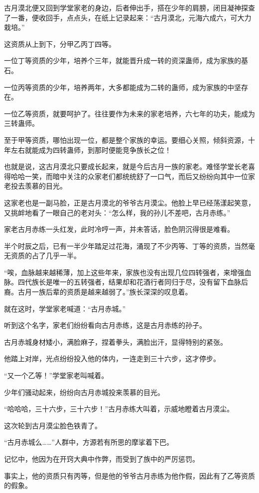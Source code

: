 \begin{this_body}
古月漠北便又回到学堂家老的身边，后者伸出手，搭在少年的肩膀，闭目凝神探查了一番，便收回手，点点头，在纸上记录起来：“古月漠北，元海六成六，可大力栽培。”

这资质从上到下，分甲乙丙丁四等。

一位丁等资质的少年，培养个三年，就能晋升成一转的资深蛊师，成为家族的基石。

一位丙等资质的少年，培养两年，大多都能成为二转的蛊师，成为家族的中坚存在。

一位乙等资质，就要呵护了。往往要作为未来的家老培养，六七年的功夫，能成为三转蛊师。

至于甲等资质，哪怕出现一位，都是整个家族的幸运。要细心关照，倾斜资源，十年左右就能成为四转蛊师，到那时便能竞争族长之位！

也就是说，这古月漠北只要成长起来，就是今后古月一族的家老。难怪学堂长老喜得哈哈一笑，而暗中关注的众家老们都统统舒了一口气，而后又纷纷向其中一位家老投去羡慕的目光。

这家老也是一副马脸，正是古月漠北的爷爷古月漠尘。他脸上早已经荡漾起笑意，又挑衅地看了一眼自己的老对头：“怎么样，我的孙儿不差吧，古月赤练。”

家老古月赤练一头红发，此时冷哼一声，并未答话，脸色阴沉得很是难看。

半个时辰之后，已有一半少年踏足过花海，涌现了不少丙等、丁等的资质，当然毫无资质的占了几乎一半。

“唉，血脉越来越稀薄，加上这些年来，家族也没有出现几位四转强者，来增强血脉。四代族长是唯一的五转强者，结果却和花酒行者同归于尽，没有留下血脉后裔。古月一族后辈的资质是越来越弱了。”族长深深的叹息着。

就在这时，学堂家老喊道：“古月赤城。”

听到这个名字，家老们纷纷看向古月赤练，这是古月赤练的孙子。

古月赤城身材矮小，满脸麻子，捏着拳头，满脸出汗，显得特别的紧张。

他踏上对岸，光点纷纷投入他的体内，一连走到三十六步，这才停步。

“又一个乙等！”学堂家老叫喊着。

少年们骚动起来，纷纷向古月赤城投来羡慕的目光。

“哈哈哈，三十六步，三十六步！”古月赤练大叫着，示威地瞪着古月漠尘。

这次轮到古月漠尘脸色铁青了。

“古月赤城么……”人群中，方源若有所思的摩挲着下巴。

记忆中，他因为在开窍大典中作弊，而受到了族中的严厉惩罚。

事实上，他的资质只有丙等，但是他的爷爷古月赤练为他作假，因此有了乙等资质的假象。


\end{this_body}
